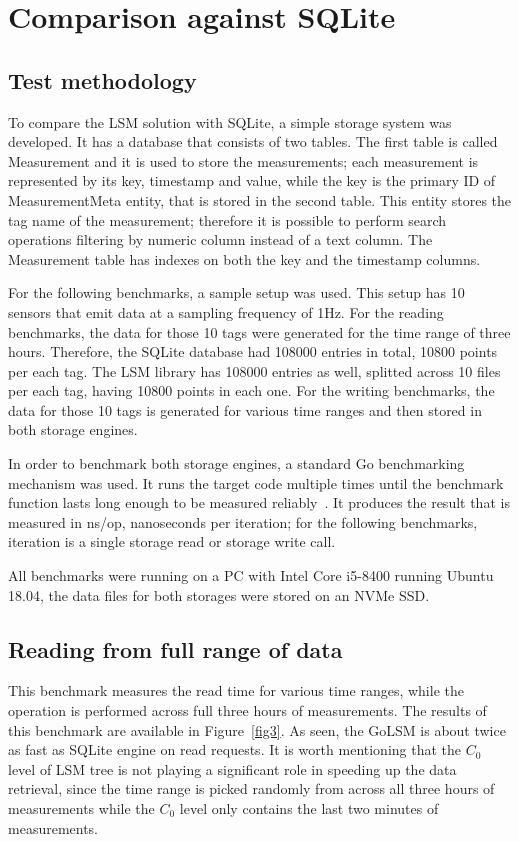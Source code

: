 \section{Comparison against SQLite}

\subsection{Test methodology}

To compare the LSM solution with SQLite, a simple storage system was developed. It has a database that consists of two tables. The first table is called Measurement and it is used to store the measurements; each measurement is represented by its key, timestamp and value, while the key is the primary ID of MeasurementMeta entity, that is stored in the second table. This entity stores the tag name of the measurement; therefore it is possible to perform search operations filtering by numeric column instead of a text column. The Measurement table has indexes on both the key and the timestamp columns.

For the following benchmarks, a sample setup was used. This setup has 10 sensors that emit data at a sampling frequency of 1Hz. For the reading benchmarks, the data for those 10 tags were generated for the time range of three hours. Therefore, the SQLite database had 108000 entries in total, 10800 points per each tag. The LSM library has 108000 entries as well, splitted across 10 files per each tag, having 10800 points in each one. For the writing benchmarks, the data for those 10 tags is generated for various time ranges and then stored in both storage engines.

In order to benchmark both storage engines, a standard Go benchmarking mechanism was used. It runs the target code multiple times until the benchmark function lasts long enough to be measured reliably~\cite{go_benchmark}. It produces the result that is measured in ns/op, nanoseconds per iteration; for the following benchmarks, iteration is a single storage read or storage write call.

All benchmarks were running on a PC with Intel Core i5-8400 running Ubuntu 18.04, the data files for both storages were stored on an NVMe SSD.

\subsection{Reading from full range of data}

This benchmark measures the read time for various time ranges, while the operation is performed across full three hours of measurements. The results of this benchmark are available in Figure~\ref{fig3}. As seen, the GoLSM is about twice as fast as SQLite engine on read requests. It is worth mentioning that the $C_0$ level of LSM tree is not playing a significant role in speeding up the data retrieval, since the time range is picked randomly from across all three hours of measurements while the $C_0$ level only contains the last two minutes of measurements.

